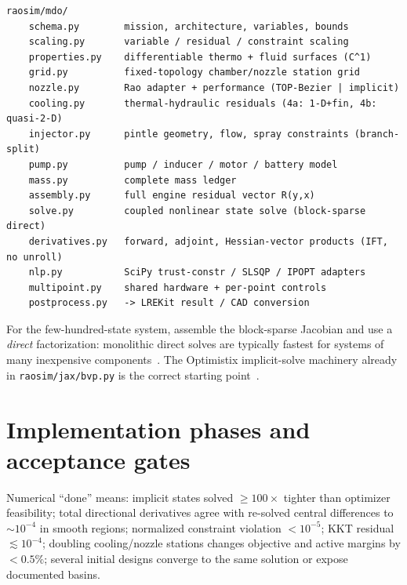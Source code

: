 \documentclass[11pt]{article}
\newcommand{\cmd}[1]{\nolinkurl{#1}}
\begin{document}
\begin{lstlisting}
raosim/mdo/
    schema.py        mission, architecture, variables, bounds
    scaling.py       variable / residual / constraint scaling
    properties.py    differentiable thermo + fluid surfaces (C^1)
    grid.py          fixed-topology chamber/nozzle station grid
    nozzle.py        Rao adapter + performance (TOP-Bezier | implicit)
    cooling.py       thermal-hydraulic residuals (4a: 1-D+fin, 4b: quasi-2-D)
    injector.py      pintle geometry, flow, spray constraints (branch-split)
    pump.py          pump / inducer / motor / battery model
    mass.py          complete mass ledger
    assembly.py      full engine residual vector R(y,x)
    solve.py         coupled nonlinear state solve (block-sparse direct)
    derivatives.py   forward, adjoint, Hessian-vector products (IFT, no unroll)
    nlp.py           SciPy trust-constr / SLSQP / IPOPT adapters
    multipoint.py    shared hardware + per-point controls
    postprocess.py   -> LREKit result / CAD conversion
\end{lstlisting}
\noindent For the few-hundred-state system, assemble the block-sparse Jacobian and
use a \emph{direct} factorization: monolithic direct solves are typically fastest
for systems of many inexpensive components~\cite{gray2019,benchmark2020}. The
Optimistix implicit-solve machinery already in \cmd{raosim/jax/bvp.py} is the
correct starting point~\cite{optimistix2024}.

\section{Implementation phases and acceptance gates}
\label{sec:phases}

Numerical ``done'' means: implicit states solved $\ge\!100\times$ tighter than
optimizer feasibility; total directional derivatives agree with re-solved central
differences to $\sim\!10^{-4}$ in smooth regions; normalized constraint violation
$<10^{-5}$; KKT residual $\lesssim 10^{-4}$; doubling cooling/nozzle stations
changes objective and active margins by $<0.5\%$; several initial designs
converge to the same solution or expose documented basins.
\end{document}
